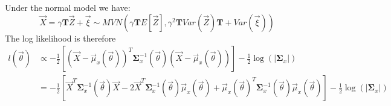 {Under the normal model we have:
$$ \vec{X} = \gamma \mathbf{T} \vec{Z} + \vec{\xi} \sim MVN \left(\gamma \mathbf{T} E\left[ \vec{Z} \right], \gamma^2 \mathbf{T} Var\left(\vec{Z}\right) \mathbf{T} + Var(\vec{\xi})\right) $$
The log likelihood is therefore
\begin{align*}
l(\vec{\theta}) &\propto -\frac{1}{2} \left [ (\vec{X} - \vec{\mu}_x(\vec{\theta}))^T \mathbf{\Sigma}_x^{-1}(\vec{\theta}) (\vec{X} - \vec{\mu}_x(\vec{\theta})) \right ] - \frac{1}{2}\log(|\mathbf{\Sigma}_x|)\\
&= -\frac{1}{2} \left [ \vec{X}^T \mathbf{\Sigma}_x^{-1}(\vec{\theta}) \vec{X} - 2 \vec{X}^T \mathbf{\Sigma}_x^{-1}(\vec{\theta}) \vec{\mu}_x(\vec{\theta}) + \vec{\mu}_x(\vec{\theta})^T \mathbf{\Sigma}_x^{-1}(\vec{\theta}) \vec{\mu}_x(\vec{\theta}) \right ] - \frac{1}{2}\log(|\mathbf{\Sigma}_x|)
\end{align*}

}
